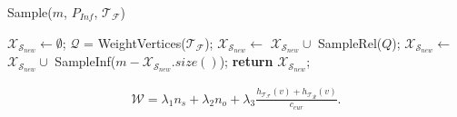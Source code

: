 






\begin{algorithm}[t]
	\caption{Sample($m$, $P_{Inf}$, $\mathcal{T}_{\mathcal{F}}$)}
    \label{SampleFunction}
        \begin{algorithmic}[1]
            \State $\mathcal{X}_{\mathcal{S}_{new}} \gets \emptyset $;
            \State $\mathcal{Q}$ = WeightVertices($\mathcal{T}_{\mathcal{F}}$); \label{WeightVertices}
            \State $\mathcal{X}_{\mathcal{S}_{new}} \gets $ $\mathcal{X}_{\mathcal{S}_{new}} \cup $ SampleRel($Q$); \label{RelevantSampleLine}
            \State $\mathcal{X}_{\mathcal{S}_{new}} \gets $ $\mathcal{X}_{\mathcal{S}_{new}} \cup $ SampleInf($m - \mathcal{X}_{\mathcal{S}_{new}}.size()$);
            \State \textbf{return} $\mathcal{X}_{\mathcal{S}_{new}}$;
        \end{algorithmic}
\end{algorithm}

\begin{equation}
    \begin{aligned}
        \label{WeightFunction}
        \mathcal{W} = \lambda_1 n_{s} + \lambda_2 n_{o} + \lambda_3 \frac{h_{\mathcal{T}_{\mathcal{F}}}(v) + h_{\mathcal{T}_{\mathcal{R}}}(v)}{c_{cur}}.
    \end{aligned}
\end{equation}

